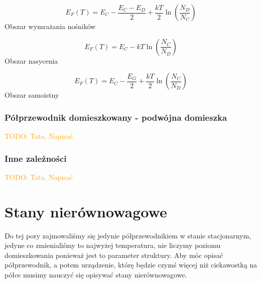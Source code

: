             \begin{center}
                \begin{minipage}[b]{0.32\textwidth}
                    \small
                    \begin{equation*}
                        E_F(T) = E_C - \frac{E_C - E_D}{2} + \frac{kT}{2}\ln\left(\frac{N_D}{N_C}\right)
                    \end{equation*}
                    \centering
                    Obszar wymrażania nośników
                \end{minipage}
                \hfill
                \begin{minipage}[b]{0.32\textwidth}
                    \small
                    \begin{equation*}
                        E_F(T) = E_C - kT\ln\left(\frac{N_C}{N_D}\right)
                    \end{equation*}
                    \centering
                    Obszar nasycenia
                \end{minipage}
                \hfill
                \begin{minipage}[b]{0.32\textwidth}
                    \small
                    \begin{equation*}
                        E_F(T) = E_C - \frac{E_G}{2} + \frac{kT}{2}\ln\left(\frac{N_C}{N_D}\right)
                    \end{equation*}
                    \centering
                    Obszar samoistny
                \end{minipage}
            \end{center}

        \subsubsection{Półprzewodnik domieszkowany - podwójna domieszka}
            \textcolor{orange}{TODO: Tata, Napisać}
        \subsubsection{Inne zależności}            
            \textcolor{orange}{TODO: Tata, Napisać}

\section{Stany nierównowagowe}
    Do tej pory zajmowaliśmy się jedynie półprzewodnikiem w stanie stacjonarnym, jedyne co zmienialiśmy to najwyżej temperatura, nie liczymy poziomu domieszkowania ponieważ jest to parameter struktury. Aby móc opisać półprzewodnik, a potem urządzenie, którę będzie czymś więcej niż ciekawostką na półce musimy nauczyć się opisywać stany nierównowagowe. 
